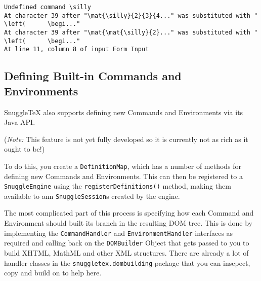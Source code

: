 \begin{verbatim}
Undefined command \silly
At character 39 after "\mat{\silly}{2}{3}{4..." was substituted with "   \left(      \begi..."
At character 39 after "\mat{\mat{\silly}{2}..." was substituted with "   \left(      \begi..."
At line 11, column 8 of input Form Input
\end{verbatim}

\subsection*{Defining Built-in Commands and Environments}

SnuggleTeX also supports defining new Commands and Environments via its Java API.

(\emph{Note:} This feature is not yet fully developed so it is currently not as
rich as it ought to be!)

To do this, you create a \verb|DefinitionMap|, which has a number of methods for
defining new Commands and Environments. This can then be registered to a \verb|SnuggleEngine|
using the \verb|registerDefinitions()| method, making them available to ann \verb|SnuggleSession|s
created by the engine.

The most complicated part of this process is specifying how each Command and
Environment should built its branch in the resulting DOM tree. This is done
by implementing the \verb|CommandHandler| and \verb|EnvironmentHandler| interfaces
as required and calling back on the \verb|DOMBuilder| Object that gets passed
to you to build XHTML, MathML and other XML structures. There are already a lot
of handler classes in the \verb|snuggletex.dombuilding| package that you can
insepect, copy and build on to help here.
